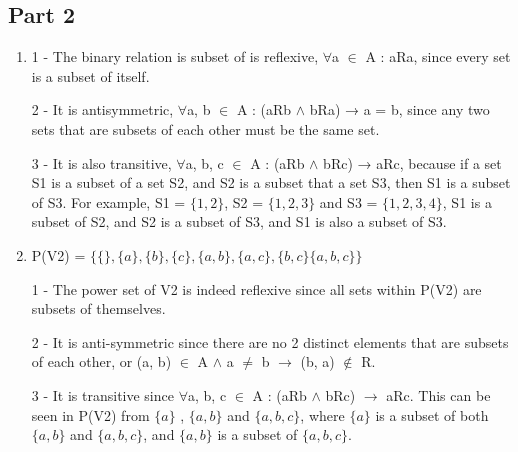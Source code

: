 \documentclass[12pt]{article}
\begin{document}
\subsection*{Part 2}
\begin{enumerate}
	\item 
	1 - The binary relation is subset of is reflexive, $\forall$a $\in$ A : aRa, since every set is a subset of itself.
	
	2 - It is antisymmetric, $\forall$a, b $\in$ A : (aRb $\wedge$ bRa) → a = b, since any two sets that are subsets of each other must be the same set.
	
	3 - It is also transitive, $\forall$a, b, c $\in$ A : (aRb $\wedge$ bRc) → aRc, because if a set S1 is a subset of a set S2, and S2 is a subset that a set S3, then S1 is a subset of S3.
	For example, S1 = $\{1 , 2\}$, S2 = $\{1 , 2 , 3\}$ and S3 = $\{1 , 2 , 3 , 4\}$, S1 is a subset of S2, and S2 is a subset of S3, and S1 is also a subset of S3.
	
	\item
	P(V2) = $\{\{\} , \{a\} , \{b\} , \{c\} , \{a,b\} , \{a,c\} , \{b,c\} \{a,b,c\}\}$
	
	1 - The power set of V2 is indeed reflexive since all sets within P(V2) are subsets of themselves.
	
	2 - It is anti-symmetric since there are no 2 distinct elements that are subsets of each other, or (a, b) $\in$ A $\wedge$ a $\neq$ b $\rightarrow$ (b, a) $\not\in$ R.
	
	3 - It is transitive since $\forall$a, b, c $\in$ A : (aRb $\wedge$ bRc) $\rightarrow$ aRc. This can be seen in P(V2) from $\{a\}$ , $\{a,b\}$ and $\{a,b,c\}$, where $\{a\}$ is a subset of both $\{a,b\}$ and $\{a,b,c\}$, and $\{a,b\}$ is a subset of $\{a,b,c\}$.
\end{enumerate}
\end{document}
